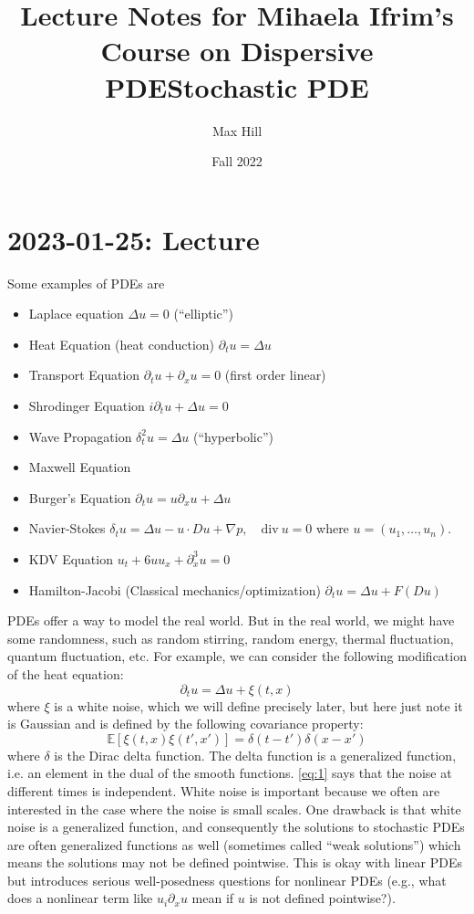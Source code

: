 \documentclass{article}
\title{Lecture Notes for Mihaela Ifrim's Course on Dispersive PDE}
\date{Fall 2022}
\def\E{\mathbb{E}} %
\begin{document}
\title{Stochastic PDE}
\author{Max Hill}
\maketitle
\tableofcontents
\newpage
\section{2023-01-25: Lecture}

Some examples of PDEs are
\begin{itemize}
  \item Laplace equation $\Delta u = 0$ (``elliptic'')
  \item Heat Equation (heat conduction) $\partial_{t}u = \Delta u $
  \item Transport Equation $\partial_{t}u + \partial_{x}u = 0$ (first order
  linear)
  \item Shrodinger Equation $i \partial_{t}u + \Delta u = 0$
  \item Wave Propagation $\delta_{t}^{2}u = \Delta u$ (``hyperbolic'')
  \item Maxwell Equation  
  \item Burger's Equation $\partial_{t}u = u\partial_{x}u +\Delta u $
  \item Navier-Stokes
  $\delta_{t}u = \Delta u - u \cdot Du + \nabla p , \quad \mathrm{div}\ u =0$
  where $u = (u_{1},\ldots,u_{n})$. 
 \item KDV Equation  $u_{t}+6uu_{x}+\partial_{x}^{3}u=0 $
 \item Hamilton-Jacobi (Classical mechanics/optimization)
 $\partial_{t}u=\Delta u+F(Du) $
\end{itemize}
PDEs offer a way to model the real world. But in the real world, we might have
some randomness, such as random stirring, random energy, thermal fluctuation,
quantum fluctuation, etc. For example, we can consider the following
modification of the heat equation:
\begin{equation*}
  \partial_{t}u = \Delta u +\xi(t,x)
\end{equation*}
where $\xi$ is a white noise, which we will define precisely later, but here
just note it is Gaussian and is defined by the following covariance property:
\begin{equation}
  \label{eq:1}
  \E\left[\xi(t,x)\xi(t',x') \right] = \delta(t-t')\delta(x-x')
\end{equation}
where $\delta$ is the Dirac delta function. The delta function is a generalized
function, i.e. an element in the dual of the smooth functions. \cref{eq:1} says
that the noise at different times is independent. White noise is important
because we often are interested in the case where the noise is small scales. One
drawback is that white noise is a generalized function, and consequently the
solutions to stochastic PDEs are often generalized functions as well (sometimes
called ``weak solutions'') which means the solutions may not be defined
pointwise. This is okay with linear PDEs but introduces serious well-posedness
questions for nonlinear PDEs (e.g., what does a nonlinear term like
$u_{i}\partial_{x}u$ mean if $u$ is not defined pointwise?).
\end{document}
